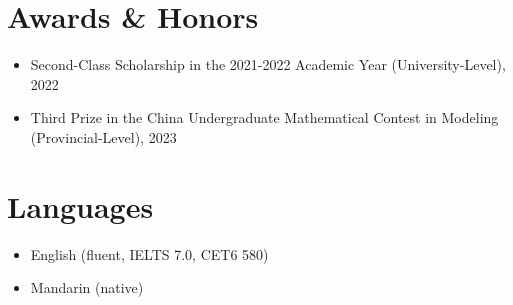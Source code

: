 \documentclass[11pt,a4paper]{article}
\begin{document}
\section{Awards \& Honors}
\begin{itemize}[leftmargin=*,nosep]
    \item Second-Class Scholarship in the 2021-2022 Academic Year (University-Level), 2022
    \item Third Prize in the China Undergraduate Mathematical Contest in Modeling (Provincial-Level), 2023

\end{itemize}

\section{Languages}
\begin{itemize}[leftmargin=*,nosep]
    \item English (fluent, IELTS 7.0, CET6 580)
    \item Mandarin (native)
\end{itemize}
\end{document}
